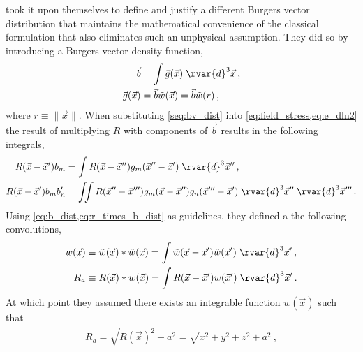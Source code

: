  took it upon themselves to define and justify a different Burgers vector distribution that maintains the mathematical convenience of the classical formulation that also eliminates such an unphysical assumption. They did so by introducing a Burgers vector density function,
\begin{subequations}\label{eq:b_dist}
    \begin{align}
        \vec{b}          & = \int \vec{g}(\vec{x}) \;\rvar{d}^{3} \vec{x}\label{seq:bv_dist}\,, \\
        \vec{g}(\vec{x}) & = \vec{b} \tilde{w}(\vec{x}) = \vec{b} \tilde{w}(r)\,,
    \end{align}
\end{subequations}
where $ r \equiv \lVert \vec{x} \rVert $. When substituting \cref{seq:bv_dist} into \cref{eq:field_stress,eq:e_dln2} the result of multiplying $ R $ with components of $ \vec{b} $ results in the following integrals,
\begin{subequations}\label{eq:r_times_b_dist}
    \begin{align}
        R(\vec{x} - \vec{x}') b_{m}        & = \int R(\vec{x} - \vec{x}'') g_{m}(\vec{x}'' - \vec{x}') \;\rvar{d}^{3}\vec{x}''\,,                                                          \\
        R(\vec{x} - \vec{x}') b_{m} b'_{n} & = \iint R(\vec{x}'' - \vec{x}''') g_{m}(\vec{x} - \vec{x}'') g_{n}(\vec{x}''' - \vec{x}') \;\rvar{d}^{3}\vec{x}'' \;\rvar{d}^{3}\vec{x}'''\,.
    \end{align}
\end{subequations}
Using \cref{eq:b_dist,eq:r_times_b_dist} as guidelines, they defined a the following convolutions,
\begin{subequations}
    \begin{align}
        w(\vec{x}) & \equiv \tilde{w}(\vec{x}) * \tilde{w}(\vec{x}) = \int \tilde{w}(\vec{x}-\vec{x}')\tilde{w}(\vec{x}')\; \rvar{d}^{3} \vec{x}'\,, \\
        R_{a}      & \equiv R(\vec{x}) * w(\vec{x}) = \int R(\vec{x} - \vec{x}') w(\vec{x}') \;\rvar{d}^{3} \vec{x}'\,.
    \end{align}
\end{subequations}
At which point they assumed there exists an integrable function $ w(\vec{x}) $ such that
\begin{align}
    R_{a} = \sqrt{R(\vec{x})^{2} + a^{2}} = \sqrt{x^{2} + y^{2} + z^{2} + a^{2}}\,,
\end{align}
